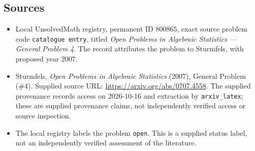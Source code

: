\documentclass[11pt]{article}
\begin{document}
\subsection{Sources}
\begin{itemize}
\item Local UnsolvedMath registry, permanent ID \(800865\), exact source problem code \texttt{catalogue entry}, titled \emph{Open Problems in Algebraic Statistics --- General Problem 4}. The record attributes the problem to Sturmfels, with proposed year 2007.
\item Sturmfels, \emph{Open Problems in Algebraic Statistics} (2007), General Problem (\#4). Supplied source URL: \url{https://arxiv.org/abs/0707.4558}. The supplied provenance records access on 2026-10-16 and extraction by \texttt{arxiv\_latex}; these are supplied provenance claims, not independently verified access or source inspection.
\item The local registry labels the problem \texttt{open}. This is a supplied status label, not an independently verified assessment of the literature.
\end{itemize}
\end{document}
